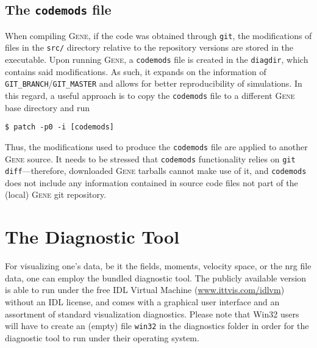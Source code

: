 \documentclass[12pt]{article}
\begin{document}
\subsection{The \texttt{codemods} file}
\label{subsec:codemods-file}

When compiling \textsc{Gene}, if the code was obtained through {\tt git}, the modifications of files in
the \texttt{src/} directory relative to the repository versions are stored in the executable.
Upon running \textsc{Gene}, a \texttt{codemods} file is created in the \texttt{diagdir}, which
contains said modifications. As such, it expands on the information of \texttt{GIT\_BRANCH}/{\tt GIT\_MASTER} and
allows for better reproducibility of simulations. In this regard, a useful approach is to copy
the \texttt{codemods} file to a different \textsc{Gene} base directory and run
\begin{verbatim}
$ patch -p0 -i [codemods]
\end{verbatim}
Thus, the modifications used to produce the \texttt{codemods} file are applied to another
\textsc{Gene} source. It needs to be stressed that \texttt{codemods} functionality relies on
\texttt{git diff}---therefore, downloaded \textsc{Gene} tarballs cannot make use of it, and
\texttt{codemods} does not include any information contained in source code files not part of
the (local) \textsc{Gene} git repository.



\newpage

\section{The Diagnostic Tool}
\label{sec:diag}

For visualizing one's \gene data, be it the fields, moments,
velocity space, or the nrg file data, one can employ the bundled
diagnostic tool. The publicly available version is able to run
under the free IDL Virtual Machine (\url{www.ittvis.com/idlvm})
without an IDL license, and comes with a graphical user interface and an
assortment of standard visualization diagnostics. Please note that
Win32 users will have to create an (empty) file \verb|win32| in
the diagnostics folder in order for the \gene diagnostic tool to
run under their operating system.
\end{document}
